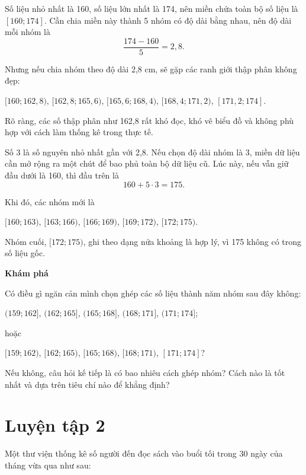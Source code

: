 \documentclass[
  letterpaper,
  DIV=11,
  numbers=noendperiod]{scrartcl}
\begin{document}
Số liệu nhỏ nhất là 160, số liệu lớn nhất là 174, nên miền chứa toàn bộ
số liệu là \([160; 174]\). Cần chia miền này thành 5 nhóm có độ dài bằng
nhau, nên độ dài mỗi nhóm là \[
    \frac{174-160}{5}=2,8.
\]

Nhưng nếu chia nhóm theo độ dài 2,8 cm, sẽ gặp các ranh giới thập phân
không đẹp:

\([160;162,8)\), \([162,8;165,6)\), \([165,6;168,4)\),
\([168,4;171,2)\), \([171,2;174]\).

Rõ ràng, các số thập phân như 162,8 rất khó đọc, khó vẽ biểu đồ và không
phù hợp với cách làm thống kê trong thực tế.

Số 3 là số nguyên nhỏ nhất gần với 2,8. Nếu chọn độ dài nhóm là 3, miền
dữ liệu cần mở rộng ra một chút để bao phủ toàn bộ dữ liệu cũ. Lúc này,
nếu vẫn giữ đầu dưới là 160, thì đầu trên là \[
    160+5\cdot 3 = 175.
\]

Khi đó, các nhóm mới là

\([160;163)\), \([163;166)\), \([166;169)\), \([169;172)\),
\([172;175)\).

Nhóm cuối, \([172; 175)\), ghi theo dạng nửa khoảng là hợp lý, vì 175
không có trong số liệu gốc.

\begin{tcolorbox}[enhanced jigsaw, breakable, opacityback=0, left=2mm, leftrule=.75mm, arc=.35mm, colframe=quarto-callout-note-color-frame, rightrule=.15mm, colback=white, bottomrule=.15mm, toprule=.15mm]

\vspace{-3mm}\textbf{Khám phá}\vspace{3mm}

Có điều gì ngăn cản mình chọn ghép các số liệu thành năm nhóm sau đây
không:

\((159;162]\), \((162;165]\), \((165;168]\), \((168;171]\),
\((171;174]\);

hoặc

\([159;162)\), \([162;165)\), \([165;168)\), \([168;171)\),
\([171;174]\)?

Nếu không, câu hỏi kế tiếp là có bao nhiêu cách ghép nhóm? Cách nào là
tốt nhất và dựa trên tiêu chí nào để khẳng định?

\end{tcolorbox}

\section*{Luyện tập 2}

Một thư viện thống kê số người đến đọc sách vào buổi tối trong 30 ngày
của tháng vừa qua như sau:
\end{document}
